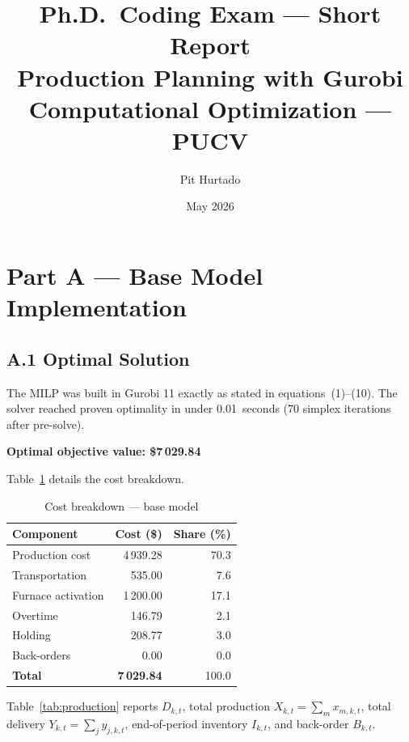 \documentclass[11pt,a4paper]{article}
\title{\textbf{Ph.D.\ Coding Exam --- Short Report}\\[4pt]
\large Production Planning with Gurobi\\[2pt]
\normalsize Computational Optimization --- PUCV}
\author{Pit Hurtado}
\date{May 2026}
\begin{document}
\maketitle
\tableofcontents
\newpage

\section{Part A --- Base Model Implementation}

\subsection{A.1\; Optimal Solution}

The MILP was built in Gurobi 11 exactly as stated in equations~(1)--(10).
The solver reached proven optimality in under 0.01~seconds (70 simplex
iterations after pre-solve).

\medskip
\noindent\textbf{Optimal objective value: \$7\,029.84}

\medskip
Table~\ref{tab:cost} details the cost breakdown.

\begin{table}[H]
\centering
\caption{Cost breakdown --- base model}
\label{tab:cost}
\begin{tabular}{lrr}
\toprule
Component & Cost (\$) & Share (\%) \\
\midrule
Production cost    & 4\,939.28 & 70.3 \\
Transportation     &   535.00  &  7.6 \\
Furnace activation & 1\,200.00 & 17.1 \\
Overtime           &   146.79  &  2.1 \\
Holding            &   208.77  &  3.0 \\
Back-orders        &     0.00  &  0.0 \\
\midrule
\textbf{Total}     & \textbf{7\,029.84} & 100.0 \\
\bottomrule
\end{tabular}
\end{table}

Table~\ref{tab:production} reports $D_{k,t}$, total production
$X_{k,t}=\sum_m x_{m,k,t}$, total delivery $Y_{k,t}=\sum_j y_{j,k,t}$,
end-of-period inventory $I_{k,t}$, and back-order $B_{k,t}$.
\end{document}
